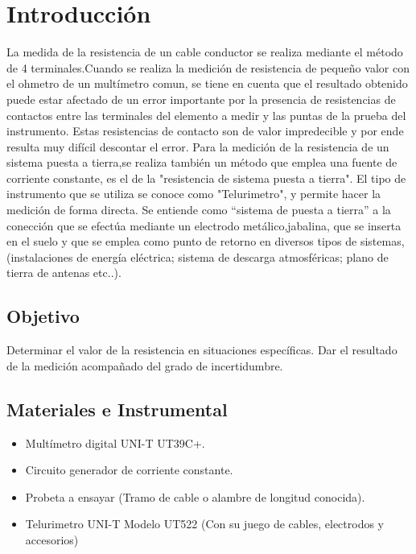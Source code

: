 \documentclass[12pt, letterpaper]{article}
\begin{document}
\newpage
\tableofcontents
\newpage
\section{Introducción}

La medida de la resistencia de un cable conductor se realiza mediante 
el método de 4 terminales.Cuando se realiza la medición de resistencia
de pequeño valor con el ohmetro de un multímetro comun, se tiene en cuenta
que el resultado obtenido puede estar afectado de un error importante
por la presencia de resistencias de contactos entre las terminales del
elemento a medir y las puntas de la prueba del instrumento. Estas resistencias
de contacto son de valor impredecible y por ende resulta muy difícil descontar 
el error. 
\singlespacing
Para la medición de la resistencia de un sistema puesta a tierra,se realiza 
también un método que emplea una fuente de corriente constante, es el de la "resistencia
de sistema puesta a tierra". El tipo de instrumento que se utiliza se conoce como
"Telurimetro", y permite hacer la medición de forma directa. Se entiende como “sistema de puesta a tierra” 
a la conección que se efectúa mediante un electrodo metálico,jabalina, que se inserta en el suelo y 
que se emplea como punto de retorno en diversos tipos de sistemas, (instalaciones de energía 
eléctrica; sistema de descarga atmosféricas; plano de tierra de antenas etc..).

\subsection{Objetivo}
Determinar el valor de la resistencia en situaciones específicas. Dar el resultado de la
medición acompañado del grado de incertidumbre.

\subsection{Materiales e Instrumental}
\begin{itemize}
	\item Multímetro digital UNI-T UT39C+.
	\item Circuito generador de corriente constante.
	\item Probeta a ensayar (Tramo de cable o alambre de longitud conocida).
	\item Telurimetro UNI-T Modelo UT522 (Con su juego de cables, electrodos y accesorios)
\end{itemize}
\end{document}
